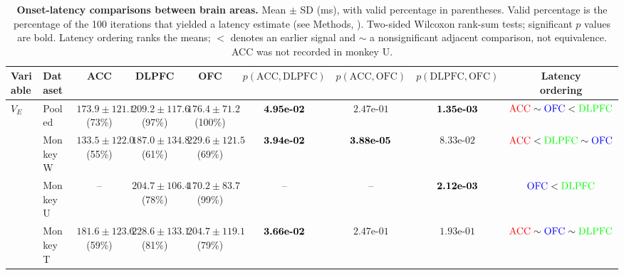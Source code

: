 \documentclass[pdflatex,sn-mathphys-num]{sn-jnl}%
\begin{document}
\begin{table}[p]
\vspace{5mm}
\caption{\textbf{Onset-latency comparisons between brain areas.} Mean $\pm$ SD (ms), with valid percentage in parentheses. Valid percentage is the percentage of the 100 iterations that yielded a latency estimate (see Methods, ). Two-sided Wilcoxon rank-sum tests; significant $p$ values are bold. Latency ordering ranks the means; $<$ denotes an earlier signal and $\sim$ a nonsignificant adjacent comparison, not equivalence. ACC was not recorded in monkey U.}
\label{tab:supp_onset_by_variable}
\begingroup\fontsize{6.5}{8}\selectfont\setlength{\tabcolsep}{1pt}
\begin{tabular*}{\textwidth}{@{\extracolsep{\fill}}llccccccc@{}}\toprule
Variable & Dataset & ACC & DLPFC & OFC & $p(\mathrm{ACC},\mathrm{DLPFC})$ & $p(\mathrm{ACC},\mathrm{OFC})$ & $p(\mathrm{DLPFC},\mathrm{OFC})$ & \shortstack{Latency\\ordering}\\\midrule
$V_E$ & Pooled & \shortstack[c]{$173.9 \pm  121.1$\\(73\%)} & \shortstack[c]{$209.2 \pm  117.6$\\(97\%)} & \shortstack[c]{$176.4 \pm  71.2$\\(100\%)} & $\text{\bfseries \mbox{4.95e-02}}$ & $\mbox{2.47e-01}$ & $\text{\bfseries \mbox{1.35e-03}}$ & $\textcolor{red}{\mathrm{ACC}} \sim \textcolor{blue}{\mathrm{OFC}} < \textcolor{green}{\mathrm{DLPFC}}$ \\[2pt]
  & Monkey W & \shortstack[c]{$133.5 \pm  122.0$\\(55\%)} & \shortstack[c]{$187.0 \pm  134.8$\\(61\%)} & \shortstack[c]{$229.6 \pm  121.5$\\(69\%)} & $\text{\bfseries \mbox{3.94e-02}}$ & $\text{\bfseries \mbox{3.88e-05}}$ & $\mbox{8.33e-02}$ & $\textcolor{red}{\mathrm{ACC}} < \textcolor{green}{\mathrm{DLPFC}} \sim \textcolor{blue}{\mathrm{OFC}}$ \\[2pt]
  & Monkey U & -- & \shortstack[c]{$204.7 \pm  106.4$\\(78\%)} & \shortstack[c]{$170.2 \pm  83.7$\\(99\%)} & -- & -- & $\text{\bfseries \mbox{2.12e-03}}$ & $\textcolor{blue}{\mathrm{OFC}} < \textcolor{green}{\mathrm{DLPFC}}$ \\[2pt]
  & Monkey T & \shortstack[c]{$181.6 \pm  123.6$\\(59\%)} & \shortstack[c]{$228.6 \pm  133.1$\\(81\%)} & \shortstack[c]{$204.7 \pm  119.1$\\(79\%)} & $\text{\bfseries \mbox{3.66e-02}}$ & $\mbox{2.47e-01}$ & $\mbox{1.93e-01}$ & $\textcolor{red}{\mathrm{ACC}} \sim \textcolor{blue}{\mathrm{OFC}} \sim \textcolor{green}{\mathrm{DLPFC}}$ \\[2pt]

\end{tabular*}
\end{table}
\end{document}
